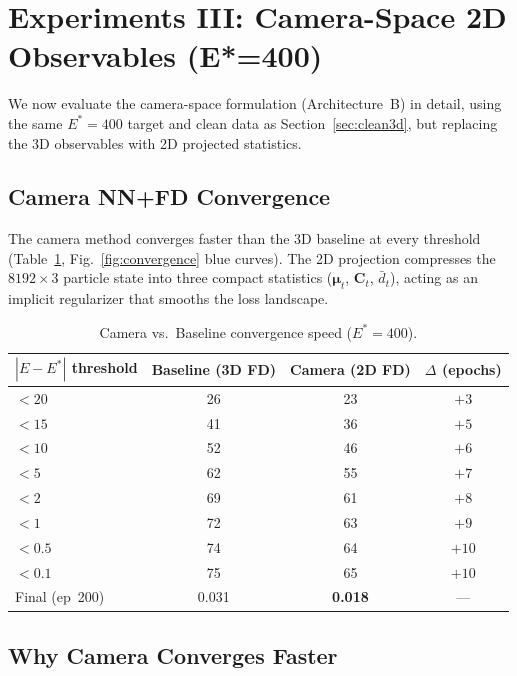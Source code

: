 \documentclass{article}
\begin{document}
\section{Experiments III: Camera-Space 2D Observables (E*=400)}
\label{sec:camera}

We now evaluate the camera-space formulation (Architecture~B) in detail,
using the same $E^*=400$ target and clean data as Section~\ref{sec:clean3d},
but replacing the 3D observables with 2D projected statistics.

\subsection{Camera NN+FD Convergence}

The camera method converges faster than the 3D baseline at every threshold
(Table~\ref{tab:camera_milestones}, Fig.~\ref{fig:convergence} blue curves).
The 2D projection compresses the $8192\times3$ particle state into three
compact statistics ($\boldsymbol{\mu}_t$, $\mathbf{C}_t$, $\bar{d}_t$),
acting as an implicit regularizer that smooths the loss landscape.

\begin{table}[H]
\centering
\caption{Camera vs.\ Baseline convergence speed ($E^*=400$).}
\label{tab:camera_milestones}
\begin{tabular}{lccc}
\toprule
$|E-E^*|$ threshold & Baseline (3D FD) & Camera (2D FD) & $\Delta$ (epochs) \\
\midrule
$<20$ & 26 & 23 & $+3$ \\
$<15$ & 41 & 36 & $+5$ \\
$<10$ & 52 & 46 & $+6$ \\
$< 5$ & 62 & 55 & $+7$ \\
$< 2$ & 69 & 61 & $+8$ \\
$< 1$ & 72 & 63 & $+9$ \\
$<0.5$& 74 & 64 & $+10$ \\
$<0.1$& 75 & 65 & $+10$ \\
\midrule
Final (ep~200) & 0.031 & \textbf{0.018} & --- \\
\bottomrule
\end{tabular}
\end{table}

\subsection{Why Camera Converges Faster}
\end{document}
